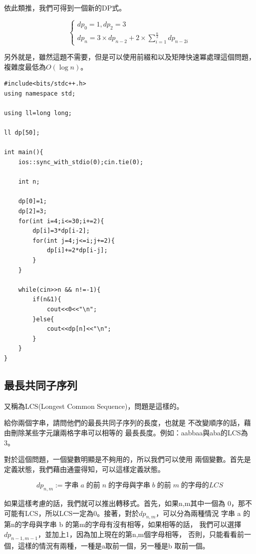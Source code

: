     依此類推，我們可得到一個新的DP式。

    $$
    \begin{cases}
        dp_0=1,dp_2=3 \\
        dp_n=3 \times dp_{n-2}+2 \times \sum_{i=1}^{\frac{n}{2}}{dp_{n-2i}}
    \end{cases}
    $$

    另外就是，雖然這題不需要，但是可以使用前綴和以及矩陣快速冪處理這個問題，
    複雜度最低為$O(\log n)$。

\begin{lstlisting}[caption=ZJ b587 題解]
#include<bits/stdc++.h>
using namespace std;

using ll=long long;

ll dp[50];

int main(){
    ios::sync_with_stdio(0);cin.tie(0);
    
    int n;

    dp[0]=1;
    dp[2]=3;
    for(int i=4;i<=30;i+=2){
        dp[i]=3*dp[i-2];
        for(int j=4;j<=i;j+=2){
            dp[i]+=2*dp[i-j];
        }
    }

    while(cin>>n && n!=-1){
        if(n&1){
            cout<<0<<"\n";
        }else{
            cout<<dp[n]<<"\n";
        }
    }
}
\end{lstlisting}

    \subsection{最長共同子序列}

    又稱為LCS(Longest Common Sequence)，問題是這樣的。

    給你兩個字串，請問他們的最長共同子序列的長度，也就是
    不改變順序的話，藉由刪除某些字元讓兩格字串可以相等的
    最長長度。例如：aabbaa與aba的LCS為3。

    對於這個問題，一個變數明顯是不夠用的，所以我們可以使用
    兩個變數。首先是定義狀態，我們藉由通靈得知，可以這樣定義狀態。

    $$dp_{n,m} := 字串 \; a \; 的前 \; n \; 的字母與
    字串 \; b \; 的前 \; m \; 的字母的LCS$$

    如果這樣考慮的話，我們就可以推出轉移式。首先，如果n,m其中一個為
    0，那不可能有LCS，所以LCS一定為0。接著，對於$dp_{n,m}$，可以分為兩種情況
    字串 a 的第n的字母與字串 b  的第m的字母有沒有相等，如果相等的話，
    我們可以選擇$dp_{n-1,m-1}$，並加上1，因為加上現在的第n,m個字母相等，
    否則，只能看看前一個，這樣的情況有兩種，一種是a取前一個，另一種是b
    取前一個。

